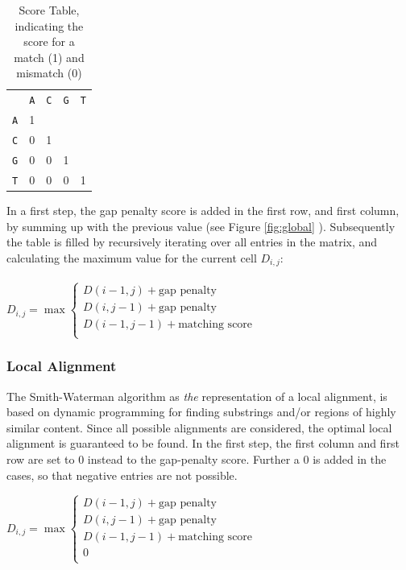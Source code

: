 \begin{table}[H]
\centering
\caption{Score Table, indicating the score for a match (1) and mismatch (0)}
\label{scoreTable}
\begin{tabular}{lllll}
  & \texttt{A} & \texttt{C} & \texttt{G} & \texttt{T} \\
 \texttt{A} & \cellcolor[HTML]{808000}1 &   &   &   \\
\texttt{C} & 0 & \cellcolor[HTML]{808000}1 &   &   \\
\texttt{G} & 0 & 0 & \cellcolor[HTML]{808000}1 &   \\
\texttt{T} & 0 & 0 & 0 & \cellcolor[HTML]{808000}1
\end{tabular}
\end{table}
In a first step, the gap penalty score is added in the first row, and first column, by summing up with the previous value (see Figure \ref{fig:global} ). Subsequently the table is filled by recursively iterating over all entries in the matrix, and calculating the maximum value for the current cell $D_{i,j}$:
\\
\\
$ D_{i,j} = \max
  \begin{cases}
    D(i-1,j)+ \text{gap penalty}      \\
    D(i,j-1)+ \text{gap penalty} \\
    D(i-1,j-1)+ \text{matching score} \\
  \end{cases}
$

\subsubsection{Local Alignment} \label{localAl}
The Smith-Waterman algorithm \cite{Smith1981} as \textit{the} representation of a local alignment, is based on dynamic programming for finding substrings and/or regions of highly similar content. Since all possible alignments are considered, the optimal local alignment is guaranteed to be found. In the first step, the first column and first row are set to 0 instead to the gap-penalty score. Further a $0$ is added in the cases, so that negative entries are not possible.

$ D_{i,j} = \max
  \begin{cases}
    D(i-1,j)+ \text{gap penalty}      \\
    D(i,j-1)+ \text{gap penalty} \\
    D(i-1,j-1)+ \text{matching score} \\
    0 \\
  \end{cases}
$


